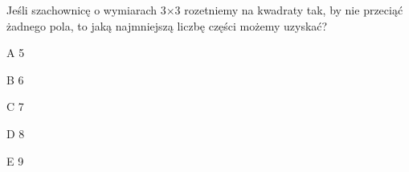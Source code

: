 \begin{tresc}
Jeśli szachownicę o wymiarach 3×3 rozetniemy na kwadraty tak, by nie przeciąć żadnego pola, to jaką najmniejszą liczbę części możemy uzyskać?
\end{tresc}
\begin{wariant}{A} 5 \end{wariant}
\begin{wariant}{B} 6 \end{wariant}
\begin{wariant}{C} 7 \end{wariant}
\begin{wariant}{D} 8 \end{wariant}
\begin{wariant}{E} 9 \end{wariant}
